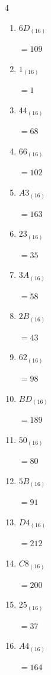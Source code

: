 \begin{multicols}{4}
\begin{enumerate}
  \item $6D_{(16)}$

        $=109$

  \item $1_{(16)}$

        $=1$

  \item $44_{(16)}$

        $=68$

  \item $66_{(16)}$

        $=102$

  \item $A3_{(16)}$

        $=163$

  \item $23_{(16)}$

        $=35$

  \item $3A_{(16)}$

        $=58$

  \item $2B_{(16)}$

        $=43$

  \item $62_{(16)}$

        $=98$

  \item $BD_{(16)}$

        $=189$

  \item $50_{(16)}$

        $=80$

  \item $5B_{(16)}$

        $=91$

\columnbreak %

\resetques

  \item $D4_{(16)}$

        $=212$

  \item $C8_{(16)}$

        $=200$

  \item $25_{(16)}$

        $=37$

  \item $A4_{(16)}$

        $=164$


\end{enumerate}
\end{multicols}
